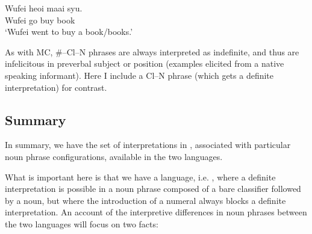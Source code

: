 \documentclass[output=paper
,modfonts
,nonflat]{langsci/langscibook}
\begin{document}
\ea \label{ex:hall:9}
\z
\z\vspace{-.5\baselineskip}

\ea
\gll Wufei heoi maai syu.\\
Wufei go buy book\\
\glt `Wufei went to buy a book/books.'\\
\z

As with MC, \#--Cl--N phrases are always interpreted as indefinite, and thus are infelicitous in preverbal subject or  position (examples elicited from a native  speaking informant). Here I include a Cl--N phrase (which gets a definite interpretation) for contrast.

\ea
{}

\z
\z

\subsection{Summary}

In summary, we have the set of interpretations in , associated with particular noun phrase configurations, available in the two languages.

What is important here is that we have a language, i.e. , where a definite interpretation is possible in a noun phrase composed of a bare classifier followed by a noun, but where the introduction of a numeral always blocks a definite interpretation. An account of the interpretive differences in noun phrases between the two languages will focus on two facts:\largerpage[2]
\end{document}
